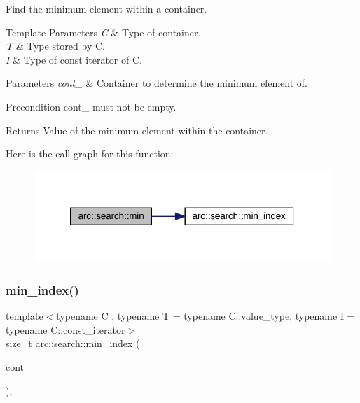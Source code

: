 Find the minimum element within a container.


\begin{DoxyTemplParams}{Template Parameters}
{\em C} & Type of container. \\
\hline
{\em T} & Type stored by C. \\
\hline
{\em I} & Type of const iterator of C.\\
\hline
\end{DoxyTemplParams}

\begin{DoxyParams}{Parameters}
{\em cont\+\_\+} & Container to determine the minimum element of.\\
\hline
\end{DoxyParams}
\begin{DoxyPrecond}{Precondition}
cont\+\_\+ must not be empty.
\end{DoxyPrecond}
\begin{DoxyReturn}{Returns}
Value of the minimum element within the container. 
\end{DoxyReturn}
Here is the call graph for this function\+:\nopagebreak
\begin{figure}[H]
\begin{center}
\leavevmode
\includegraphics[width=320pt]{namespacearc_1_1search_a1cf0173ae1f8475d3b1652c006d5649d_cgraph}
\end{center}
\end{figure}
\mbox{\label{namespacearc_1_1search_ae457da2cc210e1edfaf811bc83154f4b}} 
\subsubsection{\texorpdfstring{min\+\_\+index()}{min\_index()}}
{\footnotesize\ttfamily template$<$typename C , typename T  = typename C\+::value\+\_\+type, typename I  = typename C\+::const\+\_\+iterator$>$ \\
size\+\_\+t arc\+::search\+::min\+\_\+index (\begin{DoxyParamCaption}\item[{const C \&}]{cont\+\_\+ }\end{DoxyParamCaption})\hspace{0.3cm}{\ttfamily [inline]}, {\ttfamily [noexcept]}}

